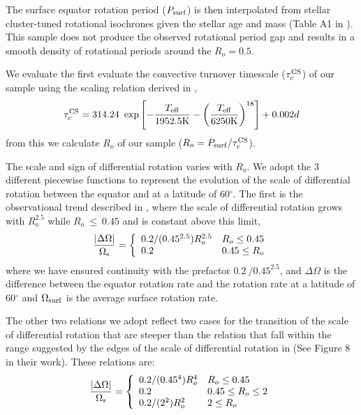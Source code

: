 The surface equator rotation period ($P_{\rm{surf}}$) is then interpolated from stellar cluster-tuned rotational isochrones given the stellar age and mass (Table A1 in \citet{spada_competing_2020}).
This sample does not produce the observed rotational period gap and results in a smooth density of rotational periods around the $R_o =0.5$.

We evaluate the first evaluate the convective turnover timescale ($\tau_c^{\rm{CS}}$) of our sample using the scaling relation derived in \citet{cranmer_testing_2011},
\begin{equation}
	\tau_c^{\rm{CS}} = 314.24 \ \exp\left[ -\frac{T_{\rm{eff}}}{1952.5\rm{K}} - \left( \frac{T_{\rm{eff}}}{6250 \rm{K}}\right)^{18}\right] + 0.002 d
\end{equation}
from this we calculate $R_o$ of our sample ($R_o = P_{\rm{surf}}/\tau_c^{\rm{CS}}$).

The scale and sign of differential rotation varies with $R_o$.
We adopt the 3 different piecewise functions to represent the evolution of the scale of differential rotation between the equator and at a latitude of 60$^{\circ}$.
The first is the observational trend described in \citet{saar_starspots_2011}, where the scale of differential rotation grows with $R_o^{2.5}$ while $R_o \ \leq \ 0.45$ and is constant above this limit,
\begin{equation}
\label{eq:rot_ex}
{\centering
\frac{|\Delta\Omega|}{\Omega_{\rm{s}}} = \left\{
\begin{array}{ll}
   0.2/(0.45^{2.5}) R_o^{2.5}& R_o\leq 0.45 \\
   0.2 & 0.45 \leq R_o
\end{array} 
\right.}
\end{equation}
where we have ensured continuity with the prefactor $0.2 \ / 0.45^{2.5}$, and $\Delta \Omega$ is the difference between the equator rotation rate and the rotation rate at a latitude of 60$^{\circ}$ and $\Omega_{\rm{surf}}$ is the average surface rotation rate.

The other two relations we adopt reflect two cases for the transition of the scale of differential rotation that are steeper than the \citet{saar_starspots_2011} relation that fall within the range suggested by the edges of the scale of differential rotation in \citet{brun_powering_2022} (See Figure 8 in their work).
These relations are:
\begin{equation}
{\centering
\frac{|\Delta\Omega|}{\Omega_{\rm{s}}} = \left\{
\begin{array}{ll}
   0.2/(0.45^4) R_o^4& R_o\leq 0.45 \\
   0.2 & 0.45\leq R_o\leq 2 \\
   0.2/(2^2) R_o^2& 2\leq R_o \\
\end{array} 
\right.}
\end{equation}

